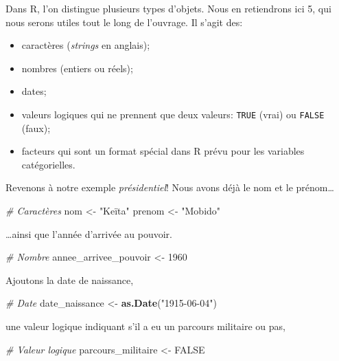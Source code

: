 \documentclass[]{book}
\newenvironment{Shaded}{\begin{snugshade}}{\end{snugshade}}
\newcommand{\KeywordTok}[1]{\textcolor[rgb]{0.13,0.29,0.53}{\textbf{#1}}}
\newcommand{\DecValTok}[1]{\textcolor[rgb]{0.00,0.00,0.81}{#1}}
\newcommand{\StringTok}[1]{\textcolor[rgb]{0.31,0.60,0.02}{#1}}
\newcommand{\CommentTok}[1]{\textcolor[rgb]{0.56,0.35,0.01}{\textit{#1}}}
\newcommand{\OtherTok}[1]{\textcolor[rgb]{0.56,0.35,0.01}{#1}}
\newcommand{\NormalTok}[1]{#1}
\begin{document}
Dans R, l'on distingue plusieurs types d'objets. Nous en retiendrons ici
5, qui nous serons utiles tout le long de l'ouvrage. Il s'agit des:

\begin{itemize}
\item
  caractères (\emph{strings} en anglais);
\item
  nombres (entiers ou réels);
\item
  dates;
\item
  valeurs logiques qui ne prennent que deux valeurs: \texttt{TRUE}
  (vrai) ou \texttt{FALSE} (faux);
\item
  facteurs qui sont un format spécial dans R prévu pour les variables
  catégorielles.
\end{itemize}

Revenons à notre exemple \emph{présidentiel}! Nous avons déjà le nom et
le prénom\ldots{}

\begin{Shaded}
\begin{Highlighting}[]
\CommentTok{# Caractères}
\NormalTok{nom <-}\StringTok{ "Keïta"}
\NormalTok{prenom <-}\StringTok{ "Mobido"}
\end{Highlighting}
\end{Shaded}

\ldots{}ainsi que l'année d'arrivée au pouvoir.

\begin{Shaded}
\begin{Highlighting}[]
\CommentTok{# Nombre}
\NormalTok{annee_arrivee_pouvoir <-}\StringTok{ }\DecValTok{1960}
\end{Highlighting}
\end{Shaded}

Ajoutons la date de naissance,

\begin{Shaded}
\begin{Highlighting}[]
\CommentTok{# Date}
\NormalTok{date_naissance <-}\StringTok{ }\KeywordTok{as.Date}\NormalTok{(}\StringTok{"1915-06-04"}\NormalTok{)}
\end{Highlighting}
\end{Shaded}

une valeur logique indiquant s'il a eu un parcours militaire ou pas,

\begin{Shaded}
\begin{Highlighting}[]
\CommentTok{# Valeur logique}
\NormalTok{parcours_militaire <-}\StringTok{ }\OtherTok{FALSE}
\end{Highlighting}
\end{Shaded}
\end{document}
